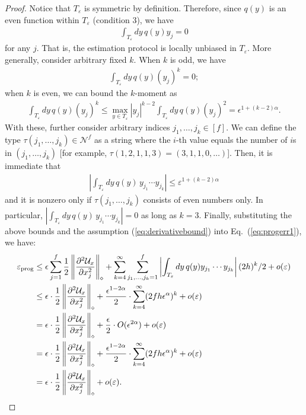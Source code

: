\documentclass[11pt,letterpaper]{article}
\def\eps{\varepsilon}
\def\map{\mathcal}
\begin{document}
\begin{proof}
    Notice that $T_\eps$ is symmetric by definition. Therefore, since $q(y)$ is an even function within $T_\eps$ (condition 3), we have
    \begin{align}
        \int_{T_\eps}dy\,q(y)y_{j}=0
    \end{align}
    for any $j$. That is, the estimation protocol is locally unbiased in $T_\eps$. 
    More generally, consider arbitrary fixed $k$. When $k$ is odd, we have 
    \begin{align}
        \int_{T_\eps}dy\,q(y)(y_{j})^k=0;
    \end{align}
    when $k$ is even, we can bound the $k$-moment as
    \begin{align}
        \int_{T_\eps}dy\,q(y)(y_{j})^k\le \max_{y\in T_\eps}|y_j|^{k-2} \int_{T_\eps}dy\,q(y)(y_{j})^2 = \epsilon^{1+(k-2)\alpha}.
    \end{align}
    With these, further consider arbitrary indices $j_1,\dots,j_k\in[f]$.
    We can define the type $\tau(j_1,\dots,j_k)\in\mathcal{N}^f$ as a string where the $i$-th value equals the number of $i$s in $(j_1,\dots,j_k)$ [for example, $\tau(1,2,1,1,3)=(3,1,1,0,\dots)$]. Then, it is immediate that 
    \begin{align}
        \left|\int_{T_\eps} dy\,q(y)\,y_{j_1}\cdots y_{j_k}\right|\le \eps^{1+(k-2)\alpha}
    \end{align}
    and it is nonzero only if  $\tau(j_1,\dots,j_k)$ consists of even numbers only. In particular, $\left|\int_{T_\eps} dy\,q(y)\,y_{j_1}\cdots y_{j_k}\right|=0$ as long as $k=3$.
    Finally, substituting the above bounds and the assumption (\ref{eq:derivativebound}) into Eq.~(\ref{eq:progerr1}), we have:
    \begin{align}
        \eps_{\rm prog}&\le \epsilon\sum_{j=1}^f\frac12\left\|\frac{\partial^2\map{U}_x}{\partial x_{j}^2}\right\|_{\diamond}+\sum_{k=4}^{\infty}\sum_{j_1,\dots,j_k=1}^{f}\left|\int_{T_\eps} dy\,q(y)y_{j_1}\cdots y_{j_k}\right|(2h)^{k}/2+o(\eps)\\
        &\le \epsilon\cdot\frac12\left\|\frac{\partial^2\map{U}_x}{\partial x_{j}^2}\right\|_{\diamond}+\frac{\epsilon^{1-2\alpha}}{2}\cdot\sum_{k=4}^{\infty}(2fh\epsilon^\alpha)^k+o(\eps)\\
        &= \epsilon\cdot\frac12\left\|\frac{\partial^2\map{U}_x}{\partial x_{j}^2}\right\|_{\diamond}+\frac{\epsilon}{2}\cdot O(\epsilon^{2\alpha})+o(\eps)\\
        &= \epsilon\cdot\frac12\left\|\frac{\partial^2\map{U}_x}{\partial x_{j}^2}\right\|_{\diamond}+\frac{\epsilon^{1-2\alpha}}{2}\cdot\sum_{k=4}^{\infty}(2fh\epsilon^\alpha)^k+o(\eps)\\
        &= \epsilon\cdot\frac12\left\|\frac{\partial^2\map{U}_x}{\partial x_{j}^2}\right\|_{\diamond}+o(\eps).
    \end{align}
\end{proof}
\end{document}
